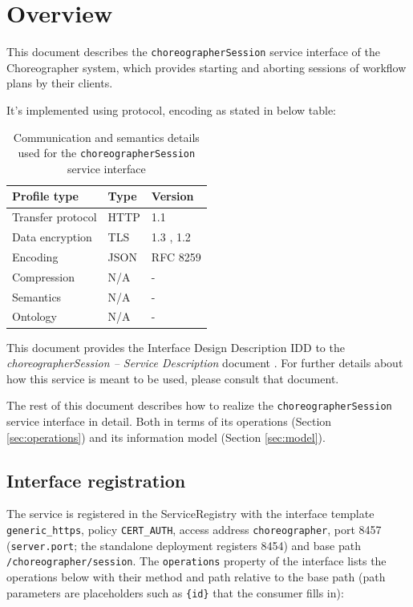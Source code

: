 \documentclass[a4paper]{arrowhead}
\begin{document}
\section{Overview}
\label{sec:overview}

This document describes the \texttt{choreographer\allowbreak{}Session} service interface of the Choreographer system, which provides starting and aborting sessions of workflow plans by their clients.

It's implemented using protocol, encoding as stated in below table:
\begin{table}[ht!]
  \centering
  \begin{tabular}{|l|l|l|}
    \hline
    \rowcolor{gray!33} Profile type & Type & Version \\ \hline
    Transfer protocol & HTTP & 1.1 \cite{rfc9112} \\ \hline
    Data encryption & TLS & 1.3 \cite{rfc8446}, 1.2 \cite{rfc5246} \\ \hline
    Encoding & JSON & RFC 8259 \cite{rfc8259} \\ \hline
    Compression & N/A & - \\ \hline
    Semantics & N/A & - \\ \hline
    Ontology & N/A & - \\ \hline
  \end{tabular}
  \caption{Communication and semantics details used for the \texttt{choreographer\allowbreak{}Session} service interface}
  \label{tab:comunication_semantics_profile}
\end{table}

This document provides the Interface Design Description IDD to the \textit{choreographerSession -- Service Description} document \cite{cho-choreographerSession-sd}.
For further details about how this service is meant to be used, please consult that document.

The rest of this document describes how to realize the \texttt{choreographer\allowbreak{}Session} service
interface in detail. Both in terms of its operations (Section \ref{sec:operations}) and its information model (Section \ref{sec:model}).

\subsection{Interface registration}

The service is registered in the ServiceRegistry with the interface template \texttt{generic\_\allowbreak{}https}, policy \texttt{CERT\_\allowbreak{}AUTH}, access address \texttt{choreographer}, port 8457 (\texttt{server.\allowbreak{}port}; the standalone deployment registers 8454) and base path \texttt{/\allowbreak{}choreographer/\allowbreak{}session}. The \texttt{operations} property of the interface lists the operations below with their method and path relative to the base path (path parameters are placeholders such as \texttt{\{id\}} that the consumer fills in):
\end{document}

